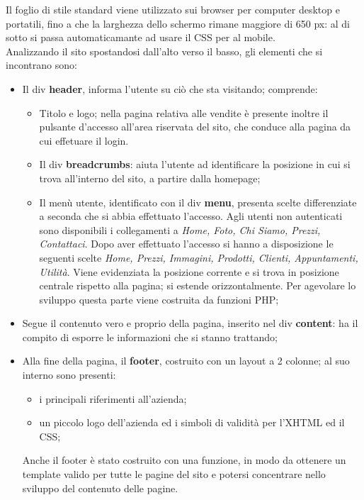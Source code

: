 {{		Il foglio di stile standard viene utilizzato sui browser per computer desktop e portatili, fino a che la larghezza dello schermo rimane maggiore di 650 px: al di sotto si passa automaticamante ad usare il CSS per al mobile.
		\\
		Analizzando il sito spostandosi dall'alto verso il basso, gli elementi che si incontrano sono:
		\begin{itemize}\itemsep1pt
			\item Il div \textbf{header}, informa l'utente su ciò che sta visitando; comprende:
			\begin{itemize}\itemsep1pt
				\item Titolo e logo; nella pagina relativa alle vendite è presente inoltre il pulsante d'accesso all'area riservata del sito, che conduce alla pagina da cui effetuare il login.
				\item Il div \textbf{breadcrumbs}: aiuta l'utente ad identificare la posizione in cui si trova all'interno del sito, a partire dalla homepage;
				\item Il menù utente, identificato con il div \textbf{menu}, presenta scelte differenziate a seconda che si abbia effettuato l'accesso. Agli utenti non autenticati sono disponibili i collegamenti a \textit{Home, Foto, Chi Siamo, Prezzi, Contattaci}. 
				Dopo aver effettuato l'accesso si hanno a disposizione le seguenti scelte \textit{Home, Prezzi, Immagini, Prodotti, Clienti, Appuntamenti, Utilità}.
				Viene evidenziata la posizione corrente e si trova in posizione centrale rispetto alla pagina; si estende orizzontalmente.
				Per agevolare lo sviluppo questa parte viene costruita da funzioni PHP;
			\end{itemize}
			\item Segue il contenuto vero e proprio della pagina, inserito nel div \textbf{content}: ha il compito di esporre le informazioni che si stanno trattando;
			\item Alla fine della pagina, il \textbf{footer}, costruito con un layout a 2 colonne; al suo interno sono presenti:
			\begin{itemize}\itemsep1pt
				\item i principali riferimenti all'azienda;
				\item un piccolo logo dell'azienda ed i simboli di validità per l'XHTML ed il CSS;
			\end{itemize}
			Anche il footer è stato costruito con una funzione, in modo da ottenere un template valido per tutte le pagine del sito e potersi concentrare nello sviluppo del contenuto delle pagine.
		\end{itemize}
		}
}
